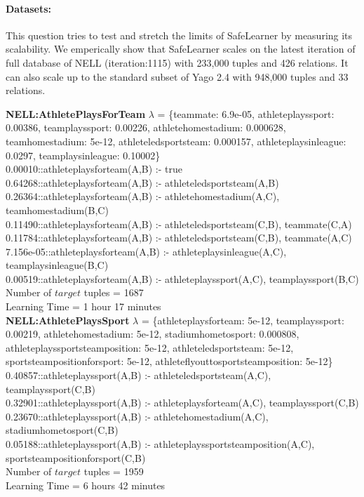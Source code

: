\documentclass[akbc,twoside,11pt]{article}
\newcommand{\algorithmname}{SafeLearner\xspace}
\begin{document}
\iffalse %

\paragraph{Datasets:} This question tries to test and stretch the limits of \algorithmname by measuring its scalability. We emperically show that \algorithmname scales on the latest iteration of full database of NELL (iteration:1115) with 233,000 tuples and 426 relations. It can also scale up to the standard subset of Yago 2.4 with 948,000 tuples and 33 relations. \\

\begin{tiny}
\noindent \textbf{NELL:AthletePlaysForTeam} $\lambda$ = \{teammate: 6.9e-05, athleteplayssport: 0.00386, teamplayssport: 0.00226, athletehomestadium: 0.000628, teamhomestadium: 5e-12, athleteledsportsteam: 0.000157, athleteplaysinleague: 0.0297, teamplaysinleague: 0.10002\} \\
0.00010::athleteplaysforteam(A,B) :- true \\
0.64268::athleteplaysforteam(A,B) :- athleteledsportsteam(A,B) \\
0.26364::athleteplaysforteam(A,B) :- athletehomestadium(A,C), teamhomestadium(B,C) \\
0.11490::athleteplaysforteam(A,B) :- athleteledsportsteam(C,B), teammate(C,A) \\
0.11784::athleteplaysforteam(A,B) :- athleteledsportsteam(C,B), teammate(A,C) \\
7.156e-05::athleteplaysforteam(A,B) :- athleteplaysinleague(A,C), teamplaysinleague(B,C) \\
0.00519::athleteplaysforteam(A,B) :- athleteplayssport(A,C), teamplayssport(B,C) \\
Number of $target$ tuples = 1687 \\
Learning Time = 1 hour 17 minutes \\ %

\noindent \textbf{NELL:AthletePlaysSport} $\lambda$ = \{athleteplaysforteam: 5e-12, teamplayssport: 0.00219, athletehomestadium: 5e-12, stadiumhometosport: 0.000808, athleteplayssportsteamposition: 5e-12, athleteledsportsteam: 5e-12, sportsteampositionforsport: 5e-12, athleteflyouttosportsteamposition: 5e-12\} \\
0.40857::athleteplayssport(A,B) :- athleteledsportsteam(A,C), teamplayssport(C,B) \\
0.32901::athleteplayssport(A,B) :- athleteplaysforteam(A,C), teamplayssport(C,B) \\
0.23670::athleteplayssport(A,B) :- athletehomestadium(A,C), stadiumhometosport(C,B) \\
0.05188::athleteplayssport(A,B) :- athleteplayssportsteamposition(A,C), sportsteampositionforsport(C,B) \\
Number of $target$ tuples = 1959 \\
Learning Time = 6 hours 42 minutes \\ %


\end{tiny}
\end{document}
